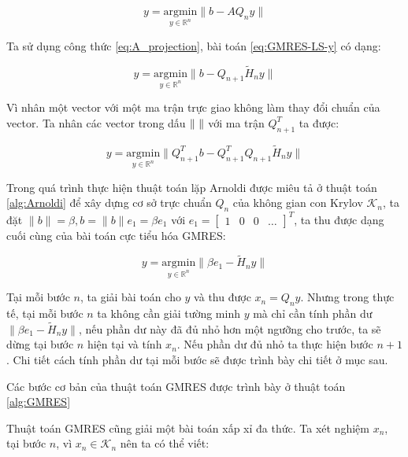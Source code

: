 \documentclass[14pt, a4paper]{article}
\numberwithin{equation}{section}
\numberwithin{algorithm}{section}
\numberwithin{figure}{section}
\numberwithin{dl}{section}
\numberwithin{md}{section}
\numberwithin{bd}{section}
\begin{document}
\begin{equation} \label{eq:GMRES-LS-y}
    y = \underset{y \in \mathbb{R}^{n}}{\mathrm{argmin}} \lVert b - A Q_n y \rVert
\end{equation}

Ta sử dụng công thức \ref{eq:A_projection}, bài toán \ref{eq:GMRES-LS-y} có dạng:

\begin{equation}
    y = \underset{y \in \mathbb{R}^{n}}{\mathrm{argmin}} \lVert b - Q_{n+1} \widetilde{H}_n y \rVert
\end{equation}

Vì nhân một vector với một ma trận trực giao không làm thay đổi chuẩn của vector. Ta nhân các vector trong dấu $\lVert \thickspace \rVert$ với ma trận $Q_{n+1}^T$ ta được:

\begin{equation}
    y = \underset{y \in \mathbb{R}^{n}}{\mathrm{argmin}} \lVert Q_{n+1}^T b - Q_{n+1}^T Q_{n+1} \widetilde{H}_n y \rVert
\end{equation}

Trong quá trình thực hiện thuật toán lặp Arnoldi được miêu tả ở thuật toán \ref{alg:Arnoldi} để xây dựng cơ sở trực chuẩn $Q_n$ của không gian con Krylov $\mathcal{K}_n$, ta đặt $\lVert b \rVert = \beta, b=\lVert b \rVert e_1=\beta e_1$ với $e_1 = \begin{bmatrix}
    1 & 0 & 0 & \dots
\end{bmatrix}^T$, ta thu được dạng cuối cùng của bài toán cực tiểu hóa GMRES:

\begin{equation}
    y = \underset{y \in \mathbb{R}^{n}}{\mathrm{argmin}} \lVert \beta e_1 - \widetilde{H}_n y \rVert
\end{equation}

Tại mỗi bước $n$, ta giải bài toán cho $y$ và thu được $x_n = Q_n y$. Nhưng trong thực tế, tại mỗi bước $n$ ta không cần giải tường minh $y$ mà chỉ cần tính phần dư $\lVert \beta e_1 - \widetilde{H}_n y \rVert$, nếu phần dư này đã đủ nhỏ hơn một ngưỡng cho trước, ta sẽ dừng tại bước $n$ hiện tại và tính $x_n$. Nếu phần dư đủ nhỏ ta thực hiện bước $n+1$. Chi tiết cách tính phần dư tại mỗi bước sẽ được trình bày chi tiết ở mục sau.

Các bước cơ bản của thuật toán GMRES được trình bày ở thuật toán \ref{alg:GMRES}

Thuật toán GMRES cũng giải một bài toán xấp xỉ đa thức. Ta xét nghiệm $x_n$, tại bước $n$, vì $x_n \in \mathcal{K}_n$ nên ta có thể viết:
\end{document}
